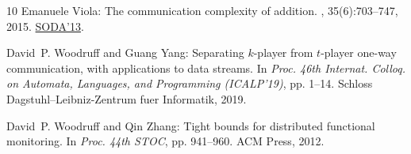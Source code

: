 \documentclass[11pt]{article}
\numberwithin{equation}{section}
\theoremstyle{definition}
\theoremstyle{plain}
\begin{document}
\begin{thebibliography}{10}
{\sc Emanuele Viola}: The communication complexity of addition.
, 35(6):703--747, 2015.
\newblock \prelim
  \href{https://dl.acm.org/doi/abs/10.5555/2627817.2627863}{SODA'13}.
\newblock [\epfmtdoi{10.1007/s00493-014-3078-3}]

{\sc David~P. Woodruff and Guang Yang}: Separating $k$-player from $t$-player
  one-way communication, with applications to data streams.
\newblock In {\em Proc. 46th Internat. Colloq. on Automata, Languages, and
  Programming (ICALP'19)}, pp. 1--14. Schloss Dagstuhl--Leibniz-Zentrum fuer
  Informatik, 2019.

{\sc David~P. Woodruff and Qin Zhang}: Tight bounds for distributed functional
  monitoring.
\newblock In {\em Proc. 44th STOC}, pp. 941--960. ACM Press, 2012.
\newblock [\epfmtdoi{10.1145/2213977.2214063}]

\end{thebibliography}
\end{document}
